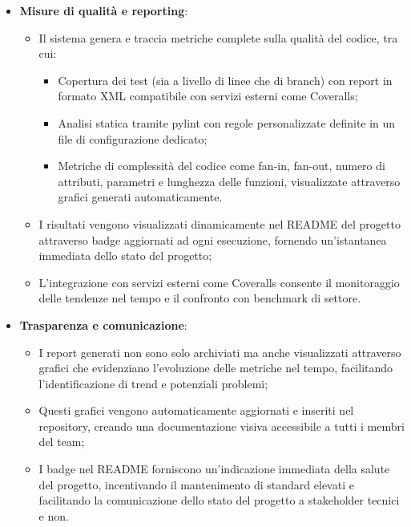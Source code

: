 \documentclass[10pt]{article}
\begin{document}
\begin{itemize}
    \item \textbf{Misure di qualità e reporting}:
    \begin{itemize}
        \item Il sistema genera e traccia metriche complete sulla qualità del codice, tra cui:
        \begin{itemize}
            \item Copertura dei test (sia a livello di linee che di branch) con report in formato XML compatibile con servizi esterni come Coveralls;
            \item Analisi statica tramite pylint con regole personalizzate definite in un file di configurazione dedicato;
            \item Metriche di complessità del codice come fan-in, fan-out, numero di attributi, parametri e lunghezza delle funzioni, visualizzate attraverso grafici generati automaticamente.
        \end{itemize}
        \item I risultati vengono visualizzati dinamicamente nel README del progetto attraverso badge aggiornati ad ogni esecuzione, fornendo un'istantanea immediata dello stato del progetto;
        \item L'integrazione con servizi esterni come Coveralls consente il monitoraggio delle tendenze nel tempo e il confronto con benchmark di settore.
    \end{itemize}
    
    \item \textbf{Trasparenza e comunicazione}:
    \begin{itemize}
        \item I report generati non sono solo archiviati ma anche visualizzati attraverso grafici che evidenziano l'evoluzione delle metriche nel tempo, facilitando l'identificazione di trend e potenziali problemi;
        \item Questi grafici vengono automaticamente aggiornati e inseriti nel repository, creando una documentazione visiva accessibile a tutti i membri del team;
        \item I badge nel README forniscono un'indicazione immediata della salute del progetto, incentivando il mantenimento di standard elevati e facilitando la comunicazione dello stato del progetto a stakeholder tecnici e non.
    \end{itemize}
    

\end{itemize}
\end{document}
